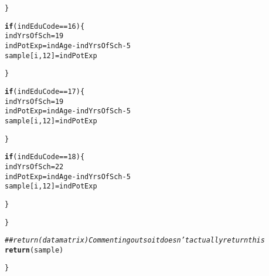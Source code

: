 \documentclass{article}\usepackage[]{graphicx}\usepackage[]{color}
\makeatletter
\newcommand{\hlnum}[1]{\textcolor[rgb]{0.686,0.059,0.569}{#1}}%
\newcommand{\hlcom}[1]{\textcolor[rgb]{0.678,0.584,0.686}{\textit{#1}}}%
\newcommand{\hlopt}[1]{\textcolor[rgb]{0,0,0}{#1}}%
\newcommand{\hlstd}[1]{\textcolor[rgb]{0.345,0.345,0.345}{#1}}%
\newcommand{\hlkwa}[1]{\textcolor[rgb]{0.161,0.373,0.58}{\textbf{#1}}}%
\newcommand{\hlkwb}[1]{\textcolor[rgb]{0.69,0.353,0.396}{#1}}%
\newcommand{\hlkwd}[1]{\textcolor[rgb]{0.737,0.353,0.396}{\textbf{#1}}}%
\newenvironment{kframe}{%
 \def\at@end@of@kframe{}%
 \ifinner\ifhmode%
  \def\at@end@of@kframe{\end{minipage}}%
  \begin{minipage}{\columnwidth}%
 \fi\fi%
 \def\FrameCommand##1{\hskip\@totalleftmargin \hskip-\fboxsep
 \colorbox{shadecolor}{##1}\hskip-\fboxsep
     \hskip-\linewidth \hskip-\@totalleftmargin \hskip\columnwidth}%
 \MakeFramed {\advance\hsize-\width
   \@totalleftmargin\z@ \linewidth\hsize
   \@setminipage}}%
 {\par\unskip\endMakeFramed%
 \at@end@of@kframe}
\newenvironment{knitrout}{}{} %
\makeatother
\begin{document}
\begin{knitrout}
\begin{kframe}
\begin{alltt}
    \hlstd{\}}

    \hlkwa{if} \hlstd{(indEduCode} \hlopt{==} \hlnum{16}\hlstd{)\{}
      \hlstd{indYrsOfSch} \hlkwb{=} \hlnum{19}
      \hlstd{indPotExp} \hlkwb{=} \hlstd{indAge} \hlopt{-} \hlstd{indYrsOfSch} \hlopt{-} \hlnum{5}
      \hlstd{sample[i,}\hlnum{12}\hlstd{]} \hlkwb{=} \hlstd{indPotExp}

    \hlstd{\}}

    \hlkwa{if} \hlstd{(indEduCode} \hlopt{==} \hlnum{17}\hlstd{)\{}
      \hlstd{indYrsOfSch} \hlkwb{=} \hlnum{19}
      \hlstd{indPotExp} \hlkwb{=} \hlstd{indAge} \hlopt{-} \hlstd{indYrsOfSch} \hlopt{-} \hlnum{5}
      \hlstd{sample[i,}\hlnum{12}\hlstd{]} \hlkwb{=} \hlstd{indPotExp}

    \hlstd{\}}

    \hlkwa{if} \hlstd{(indEduCode} \hlopt{==} \hlnum{18}\hlstd{)\{}
      \hlstd{indYrsOfSch} \hlkwb{=} \hlnum{22}
      \hlstd{indPotExp} \hlkwb{=} \hlstd{indAge} \hlopt{-} \hlstd{indYrsOfSch} \hlopt{-} \hlnum{5}
      \hlstd{sample[i,}\hlnum{12}\hlstd{]} \hlkwb{=} \hlstd{indPotExp}

    \hlstd{\}}

  \hlstd{\}}

  \hlcom{## return(datamatrix) Commenting out so it doesn't actually return this}
  \hlkwd{return}\hlstd{(sample)}

\hlstd{\}}


\end{alltt}
\end{kframe}
\end{knitrout}
\end{document}
